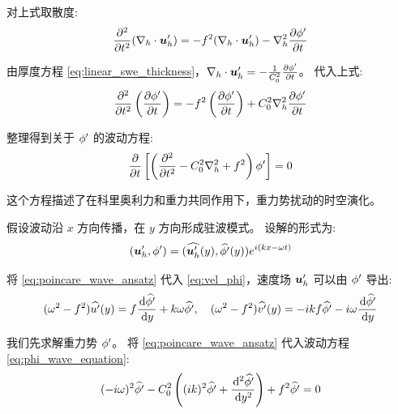 对上式取散度:
\begin{equation*}
    \pde[2]{}{\timevar} (\nabla_h \cdot \vel_h^\prime) = -\coriolis^2 (\nabla_h \cdot \vel_h^\prime) - \nabla_h^2 \pde{\gravpotential^\prime}{\timevar}
\end{equation*}

由厚度方程 \eqref{eq:linear_swe_thickness}，$\nabla_h \cdot \vel_h^\prime = -\frac{1}{C_0^2} \pde{\gravpotential^\prime}{\timevar}$。
代入上式:
\begin{equation*}
    \pde[2]{}{\timevar} \left(\pde{\gravpotential^\prime}{\timevar}\right) = -\coriolis^2 \left(\pde{\gravpotential^\prime}{\timevar}\right) + C_0^2 \nabla_h^2 \pde{\gravpotential^\prime}{\timevar}
\end{equation*}

整理得到关于 $\phi^\prime$ 的波动方程:
\begin{equation}
    \pde{}{\timevar}\left[\left(\pde[2]{}{\timevar} - C_0^2 \nabla_h^2 + \coriolis^2\right) \gravpotential^\prime\right] = 0
    \label{eq:phi_wave_equation}
\end{equation}

这个方程描述了在科里奥利力和重力共同作用下，重力势扰动的时空演化。

假设波动沿 $x$ 方向传播，在 $y$ 方向形成驻波模式。
设解的形式为:
\begin{equation}
    (\bm{u}_h^\prime, \phi^\prime) = (\widehat{\bm{u}_h^\prime}(y), \widehat{\phi^\prime}(y)) e^{i (k x - \omega t)}
    \label{eq:poincare_wave_ansatz}
\end{equation}

将 \eqref{eq:poincare_wave_ansatz} 代入 \eqref{eq:vel_phi}，速度场 $\bm{u}_h^\prime$ 可以由 $\phi^\prime$ 导出:
\begin{equation}
    (\frequency^2 - \coriolis^2) \complexamp{u^\prime}(y) = \coriolis \ode{\complexamp{\gravpotential^\prime}}{y} + k \frequency \complexamp{\gravpotential^\prime}, \quad (\frequency^2 - \coriolis^2) \complexamp{v^\prime}(y) = -i k \coriolis \complexamp{\gravpotential^\prime} - i \frequency \ode{\complexamp{\gravpotential^\prime}}{y}
    \label{eq:poincare_velocity_relation}
\end{equation}

我们先求解重力势 $\phi^\prime$。
将 \eqref{eq:poincare_wave_ansatz} 代入波动方程 \eqref{eq:phi_wave_equation}:
\begin{equation*}
    (-i\frequency)^2 \complexamp{\gravpotential^\prime} - C_0^2 \left((ik)^2 \complexamp{\gravpotential^\prime} + \ode[2]{\complexamp{\gravpotential^\prime}}{y}\right) + \coriolis^2 \complexamp{\gravpotential^\prime} = 0
\end{equation*}

